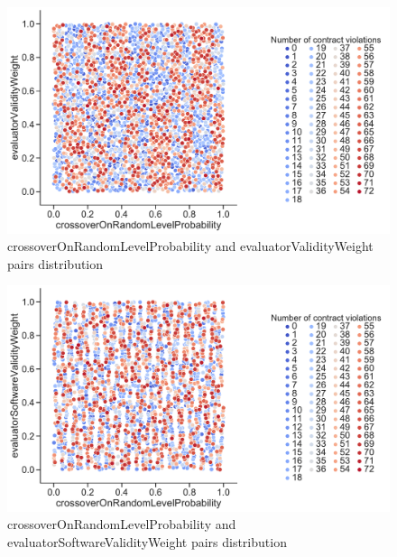 \begin{figure}
	\centering
	\includegraphics[width=\textwidth]{images/PairsDistr/crossoverOnRandomLevelProbability_evaluatorValidityWeight.pdf}
	\caption[crossoverOnRandomLevelProbability and evaluatorValidityWeight pairs distribution]{crossoverOnRandomLevelProbability and evaluatorValidityWeight pairs distribution}
	\label{fig:crossoverOnRandomLevelProbability_evaluatorValidityWeight_pair}
\end{figure}
\clearpage
\begin{figure}
	\centering
	\includegraphics[width=\textwidth]{images/PairsDistr/crossoverOnRandomLevelProbability_evaluatorSoftwareValidityWeight.pdf}
	\caption[crossoverOnRandomLevelProbability and evaluatorSoftwareValidityWeight pairs distribution]{crossoverOnRandomLevelProbability and evaluatorSoftwareValidityWeight pairs distribution} 
	\label{fig:crossoverOnRandomLevelProbability_evaluatorSoftwareValidityWeight_pair}
\end{figure}
\clearpage
